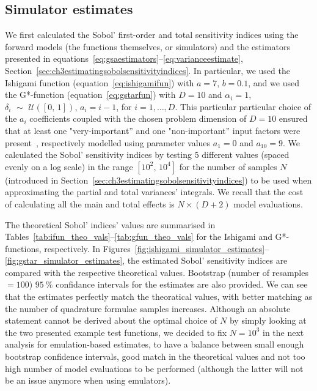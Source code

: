 \subsection{Simulator estimates}\label{chA:simulator_estimates}
We first calculated the Sobol' first-order and total sensitivity indices using the forward models (the functions themselves, or simulators) and the estimators presented in equations~\eqref{eq:gsaestimators}--\eqref{eq:varianceestimate}, Section~\ref{sec:ch3estimatingsobolsensitivityindices}. In particular, we used the Ishigami function (equation~\eqref{eq:ishigamifun}) with $a=7,\,b=0.1$, and we used the G*-function (equation~\eqref{eq:gstarfun}) with $D=10$ and $\alpha_i=1$, $\delta_i\,\,\sim\,\,\mathcal{U}([0,\,1])$, $a_i=i-1$, for $i=1,\dots,D$. This particular particular choice of the $a_i$ coefficients coupled with the chosen problem dimension of $D=10$ ensured that at least one "very-important'' and one "non-important'' input factors were present~\cite{Saltelli:2010,Marrel:2008}, respectively modelled using parameter values $a_1=0$ and $a_{10}=9$. We calculated the Sobol' sensitivity indices by testing $5$ different values (spaced evenly on a log scale) in the range $[10^2,\,10^4]$ for the number of samples $N$ (introduced in Section~\ref{sec:ch3estimatingsobolsensitivityindices}) to be used when approximating the partial and total variances' integrals. We recall that the cost of calculating all the main and total effects is $N\times(D+2)$ model evaluations.

\vspace{0.2cm}
The theoretical Sobol' indices' values are summarised in Tables~\ref{tab:ifun_theo_vals}--\ref{tab:gfun_theo_vals} for the Ishigami and G*- functions, respectively. In Figures~\ref{fig:ishigami_simulator_estimates}--\ref{fig:gstar_simulator_estimates}, the estimated Sobol' sensitivity indices are compared with the respective theoretical values. Bootstrap (number of resamples $=100$) $\SI{95}{\percent}$ confidance intervals for the estimates are also provided. We can see that the estimates perfectly match the theoratical values, with better matching as the number of quadrature formulae samples increases. Although an absolute statement cannot be derived about the optimal choice of $N$ by simply looking at the two presented example test functions, we decided to fix $N=10^3$ in the next analysis for emulation-based estimates, to have a balance between small enough bootstrap confidence intervals, good match in the theoretical values and not too high number of model evaluations to be performed (although the latter will not be an issue anymore when using emulators).

